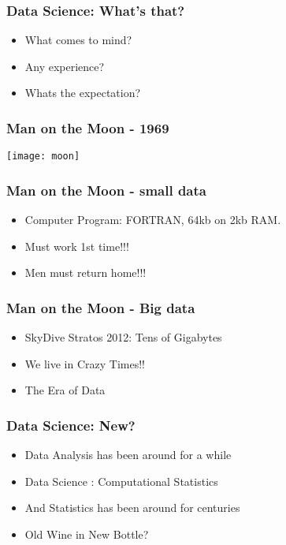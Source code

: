 \begin{frame}[fragile]\frametitle{Data Science: What's that?}
\begin{itemize}
\item What comes to mind?
\item Any experience?
\item Whats the expectation?
\end{itemize}
\end{frame}


\begin{frame}[fragile]\frametitle{Man on the Moon - 1969}
\begin{center}
\texttt{[image: moon]}
\end{center}
\end{frame}

\begin{frame}[fragile]\frametitle{Man on the Moon - small data}
\begin{itemize}
\item Computer Program: FORTRAN, 64kb on 2kb RAM. 
\item Must work 1st time!!!
\item Men must return home!!!
\end{itemize}
\end{frame}

\begin{frame}[fragile]\frametitle{Man on the Moon - Big data}
\begin{itemize}
\item SkyDive Stratos 2012: Tens of Gigabytes
\item We live in Crazy Times!!
\item The Era of Data
\end{itemize}
\end{frame}

\begin{frame}[fragile]\frametitle{Data Science: New?}

\begin{itemize}
\item Data Analysis has been around for a while
\item Data Science : Computational Statistics
\item And Statistics has been around for centuries
\item Old Wine in New Bottle?
\end{itemize}
\end{frame}


